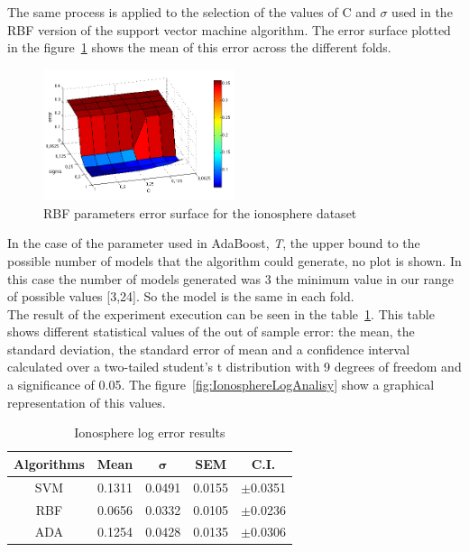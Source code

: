 \documentclass[10pt, journal]{IEEEtran}
\begin{document}
The same process is applied to the selection of the values of C and $\sigma$ used in the RBF version of the support vector machine algorithm. The error surface plotted in the figure~\ref{fig:errorSurfaceIonosphereStatLog} shows the mean of this error across the different folds.\\

\begin{figure}[ht!]
	\centering
	\includegraphics[width=0.5\textwidth]{img/errorSurfaceIonosphere}
	\caption{RBF parameters error surface for the ionosphere dataset}
	\label{fig:errorSurfaceIonosphereStatLog}
\end{figure}

In the case of the parameter used in AdaBoost, \emph{T}, the upper bound to the possible number of models that the algorithm could generate, no plot is shown. In this case the number of models generated was 3 the minimum value in our range of possible values [3,24]. So the model is the same in each fold.\\

The result of the experiment execution can be seen in the table~\ref{tab:IonosphereComparison}. This table shows different statistical values of the out of sample error: the mean, the standard deviation, the standard error of mean and a confidence interval calculated over a two-tailed student's t distribution with 9 degrees of freedom and a significance of 0.05. The figure~\ref{fig:IonosphereLogAnalisy} show a graphical representation of this values.\\

\begin{table}[ht!]
	\centering
	\begin{tabular}{|c|c|c|c|c|}
		\hline
		\textbf{Algorithms} & \textbf{Mean} & $\mathbf{\sigma}$ & \textbf{SEM} & \textbf{C.I.}\\\hline
		SVM & 0.1311 & 0.0491 & 0.0155 & $\pm$0.0351\\\hline
		RBF & 0.0656 & 0.0332 & 0.0105 & $\pm$0.0236\\\hline
		ADA & 0.1254 & 0.0428 & 0.0135 & $\pm$0.0306\\\hline
	\end{tabular}
	\label{tab:IonosphereComparison}
	\caption{Ionosphere log error results}
\end{table}
\end{document}
